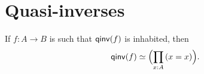 \documentclass[hott-all.tex]{subfiles}
\begin{document}
\section{Quasi-inverses}
\label{sec:quasi-inverses}


\begin{lem}\label{lem:qinv-autohtpy}
  If $f:A\to B$ is such that $\mathsf{qinv} (f)$ is inhabited, then
  \[\eqv{\qinv(f)}{\Parens{\prd{x:A}(x=x)}}.\]
\end{lem}
%
%
\end{document}
